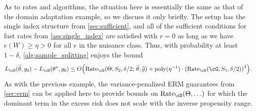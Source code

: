 \documentclass[11pt]{article} %
\newcommand{\pref}[1]{\cref{#1}}
\theoremstyle{theorem}  %
\theoremstyle{plain}
\DeclarePairedDelimiter{\prn}{(}{)}
\newcommand{\wh}[1]{\widehat{#1}}
\newcommand{\midsem}{;\,}
\newcommand{\poprisk}{L_{\cD}}
\newcommand{\estone}{\wh{g}}
\newcommand{\esttwo}{\wh{\theta}}
\newcommand{\nuisance}{\cG}
\newcommand{\target}{\Theta}
\newcommand{\Rate}{\mathrm{Rate}_{\cD}}
\newcommand{\besttwo}{\theta^{\star}}
\newcommand{\gtone}{g_0}
\newcommand{\sampleone}{S_1}
\newcommand{\sampletwo}{S_2}
\begin{document}
As to rates and algorithms, the situation here is essentially the same as that of the domain adaptation example, so we discuss it only briefly. The setup has the single index structure from \pref{sec:sufficient}, and all of the sufficient conditions for fast rates from \pref{ass:single_index} are satisfied with $r=0$ as long as we have $e(W)\geq{}\eta>0$ for all $e$ in the nuisance class. Thus, with probability at least $1-\delta$, \pref{alg:sample_splitting} enjoys the bound
\[
\poprisk(\esttwo,\gtone) - \poprisk(\besttwo,\gtone)
\leq{} O\prn*{\Rate(\target, \sampletwo, \delta/2\midsem{}\esttwo,\estone) 
+ \mathrm{poly}(\eta^{-1})\cdot\prn*{\Rate(\nuisance,\sampleone,\delta/2)}^{4}
}.
\]
As with the previous example, the variance-penalized ERM guarantees from \pref{sec:erm} can be applied here to provide bounds on $\Rate(\target,\ldots)$ for which the dominant term in the excess risk does not scale with the inverse propensity range.
\end{document}
